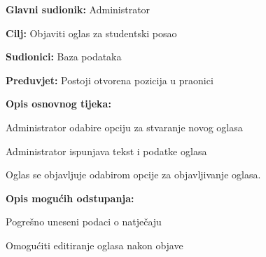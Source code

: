 				\noindent {}
				\begin{packed_item}
					
					\item \textbf{Glavni sudionik: } Administrator
					\item  \textbf{Cilj:} Objaviti oglas za studentski posao
					\item  \textbf{Sudionici:} Baza podataka
					\item  \textbf{Preduvjet:} Postoji otvorena pozicija u praonici
					\item  \textbf{Opis osnovnog tijeka:}
					
					\item[] \begin{packed_enum}
						
						\item Administrator odabire opciju za stvaranje novog oglasa
						\item Administrator ispunjava tekst i podatke oglasa
						\item Oglas se objavljuje odabirom opcije za objavljivanje oglasa.
					\end{packed_enum}
					
					\item  \textbf{Opis mogućih odstupanja:}
					
					\item[] \begin{packed_item}
						
						\item[2.a] Pogrešno uneseni podaci o natječaju
						\item[] \begin{packed_enum}
							
							\item Omogućiti editiranje oglasa nakon objave
							
						\end{packed_enum}				
					\end{packed_item}
				\end{packed_item}
			
